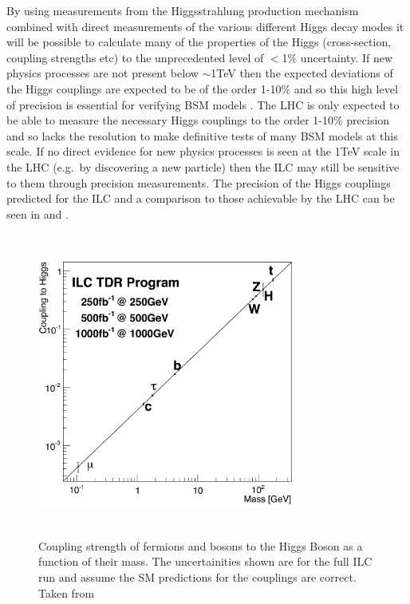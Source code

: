 By using measurements from the Higgsstrahlung production mechanism combined with direct measurements of the various different Higgs decay modes it will be possible to calculate many of the properties of the Higgs (cross-section, coupling strengths etc) to the unprecedented level of ${<}$1\% uncertainty. If new physics processes are not present below $\sim$1TeV then the expected deviations of the Higgs couplings are expected to be of the order 1-10\% and so this high level of precision is essential for verifying \ac{BSM} models \cite{PhilBurrows}. The \ac{LHC} is only expected to be able to measure the necessary Higgs couplings to the order 1-10\% precision and so lacks the resolution to make definitive tests of many \ac{BSM} models at this scale. If no direct evidence for new physics processes is seen at the 1TeV scale in the \ac{LHC} (e.g.\ by discovering a new particle) then the \ac{ILC} may still be sensitive to them through precision measurements. The precision of the Higgs couplings predicted for the \ac{ILC} and a comparison to those achievable by the \ac{LHC} can be seen in  and .  
\begin{figure}
  \centering
  \includegraphics[width=0.75\textwidth,height=10cm,keepaspectratio]{fig/HiggsCouplings2}
  \caption[Higgs Couplings]{Coupling strength of fermions and bosons to the Higgs Boson as a function of their mass. The uncertainities shown are for the full \ac{ILC} run and assume the \ac{SM} predictions for the couplings are correct. Taken from \cite{Fujii:2015jha}}
  \label{Fig:HiggsCouplings}
\end{figure}

